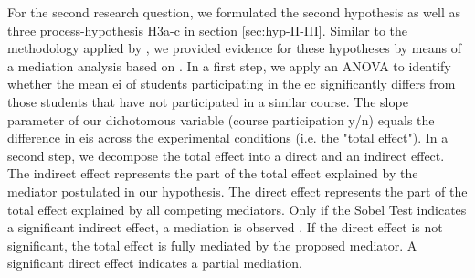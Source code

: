 For the second research question, we formulated the second hypothesis as well as three process-hypothesis H3a-c in section \ref{sec:hyp-II-III}. Similar to the methodology applied by \citet{zhao2005mediating}, we provided evidence for these hypotheses by means of a mediation analysis based on \citet{baron1986moderator}. In a first step, we apply an ANOVA to identify whether the mean \ac{ei} of students participating in the \ac{ec} significantly differs from those students that have not participated in a similar course. The slope parameter of our dichotomous variable (course participation y/n) equals the difference in \acp{ei} across the experimental conditions (i.e. the "total effect"). In a second step, we decompose the total effect into a direct and an indirect effect. The indirect effect represents the part of the total effect explained by the mediator postulated in our hypothesis. The direct effect represents the part of the total effect explained by all competing mediators. Only if the Sobel Test indicates a significant indirect effect, a mediation is observed \citep{sobel1982asymptotic}. If the direct effect is not significant, the total effect is fully mediated by the proposed mediator. A significant direct effect indicates a partial mediation. 